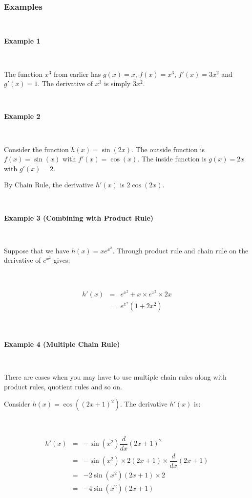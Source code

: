 \documentclass[]{article}
\begin{document}
~

\hypertarget{examples}{%
\subsubsection{Examples}\label{examples}}

~

\textbf{Example 1}

~

The function \(x^3\) from earlier has \(g(x) = x\), \(f(x) = x^3\),
\(f'(x) = 3x^2\) and \(g'(x) = 1\). The derivative of \(x^3\) is simply
\(3x^2\).

~

\textbf{Example 2}

~

Consider the function \(h(x) = \sin(2x)\). The outside function is
\(f(x) = \sin(x)\) with \(f'(x) = \cos(x)\). The inside function is
\(g(x) = 2x\) with \(g'(x) = 2\).

By Chain Rule, the derivative \(h'(x)\) is \(2 \cos(2x)\).

~

\textbf{Example 3 (Combining with Product Rule)}

~

Suppose that we have \(h(x) = x e^{x^2}\). Through product rule and
chain rule on the derivative of \(e^{x^2}\) gives:

~

\[\begin{array}{lcl} h'(x) & = & e^{x^2} + x \times e^{x^2} \times 2x \\ & = & e^{x^2} (1 + 2x^2) \\ \end{array}\]

~

\textbf{Example 4 (Multiple Chain Rule)}

~

There are cases when you may have to use multiple chain rules along with
product rules, quotient rules and so on.

Consider \(h(x) = \cos((2x + 1)^2)\). The derivative \(h'(x)\) is:

~

\[\begin{array}{lcl} h'(x) & = & - \sin(x^2) \dfrac{d}{dx} (2x + 1)^{2} \\ & = & - \sin(x^2) \times 2(2x + 1) \times \dfrac{d}{dx} (2x + 1) \\ & = & -2 \sin(x^2) (2x + 1) \times 2\\ & = & -4 \sin(x^2) (2x + 1) \end{array}\]
~
\end{document}
